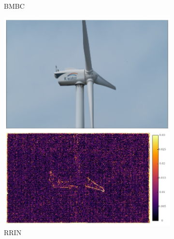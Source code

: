 \documentclass{article}
\begin{document}
\begin{figure}[h]
\begin{subfigure}{0.125\textwidth}
    \caption{BMBC}
\end{subfigure}%
\begin{subfigure}{0.125\textwidth}
	\centering
    \includegraphics[width=1\linewidth]{qua_imgs/TEST02_045_f0465_rrin.jpg}
    \caption{RRIN}
\end{subfigure}%
\begin{subfigure}{0.125\textwidth}
	\centering

\end{subfigure}
\end{figure}
\end{document}
